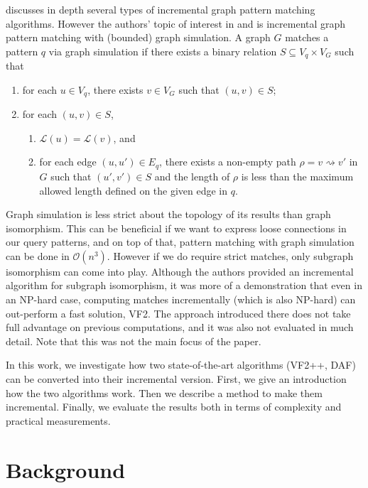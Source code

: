 \cite{incrementalpatternmatching} discusses in depth several types of incremental graph pattern matching algorithms.
However the authors' topic of interest in \cite{incrementalpatternmatching2} and \cite{incrementalpatternmatching} is incremental graph pattern matching
with (bounded) graph simulation. A graph \(G\) matches a pattern \(q\) via graph 
simulation if there exists a binary relation \(S \subseteq V_q \times V_G\) such that 
\begin{enumerate}
    \item for each \(u \in V_q\), there exists \(v \in V_G\) such that \((u, v) \in S\);
    \item for each \((u, v) \in S\), 
        \begin{enumerate}
            \item \(\mathcal{L}(u) = \mathcal{L}(v)\), and
            \item for each edge \((u, u') \in E_q\), there exists a non-empty path \(\rho = v \rightsquigarrow v'\) in \(G\) such that \((u', v') \in S\) and the length of \(\rho\) is less than the maximum allowed length defined on the given edge in \(q\).
        \end{enumerate}
\end{enumerate}
Graph simulation is less strict about the topology of its results than graph
isomorphism. This can be beneficial if we want to express loose connections in
our query patterns, and on top of that, pattern matching with graph simulation
can be done in \(\mathcal{O}(n^3)\). However if we do require strict matches,
only subgraph isomorphism can come into play. Although the authors provided an
incremental algorithm for subgraph isomorphism, it was more of a demonstration
that even in an NP-hard case, computing matches incrementally (which is also
NP-hard) can out-perform a fast solution, VF2. The approach introduced there
does not take full advantage on previous computations, and it was also not 
evaluated in much detail. Note that this was not the main focus of the paper.

In this work, we investigate how two state-of-the-art algorithms (VF2++, DAF)
can be converted into their incremental version. First, we give an introduction
how the two algorithms work. Then we describe a method to make them incremental.
Finally, we evaluate the results both in terms of complexity and practical
measurements.

\section{Background}

